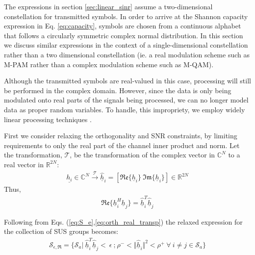 The expressions in section \ref{sec:linear_sinr} assume a two-dimensional constellation for transmitted symbols. In order to arrive at the Shannon capacity expression in Eq. \ref{eq:capacity}, symbols are chosen from a continuous alphabet that follows a circularly symmetric complex normal distribution. In this section we discuss similar expressions in the context of a single-dimensional constellation rather than a two dimensional constellation (ie. a real modulation scheme such as M-PAM rather than a complex modulation scheme such as M-QAM).

Although the transmitted symbols are real-valued in this case, processing will still be performed in the complex domain. However, since the data is only being modulated onto real parts of the signals being processed, we can no longer model data as proper random variables. To handle, this impropriety, we employ widely linear processing techniques \cite{Adali2011}.

First we consider relaxing the orthogonality and SNR constraints, by limiting  requirements to only the real part of the channel inner product and norm.  Let the  transformation, $\mathcal{T}$, be the transformation of the complex vector in $\mathbb{C}^N$ to a real vector in $\mathbb{R}^{2N}$:
\begin{equation}\label{eq:complex_real_xform}
    \begin{aligned}
        \underline{h_i} \in \mathbb{C}^N \xrightarrow{\mathcal{T}} \hat{\underline{h}}_i = [ \mathfrak{Re} \lbrace \underline{h}_i \rbrace \ \mathfrak{Im}\lbrace \underline{h}_i \rbrace ] \in \mathbb{R}^{2N}
    \end{aligned}
\end{equation}
Thus,
\begin{equation}\label{eq:orth_real_transp}
    \begin{aligned}
        \mathfrak{Re} \lbrace \underline{h}_i^H\underline{h}_j \rbrace = \hat{\underline{h}}_i^T \hat{\underline{h}}_j 
    \end{aligned}
\end{equation}

Following from Eqs. (\ref{eq:S_e},\ref{eq:orth_real_transp}) the relaxed expression for the collection of SUS groups becomes:
\begin{equation}\label{eq:wl_S_e}
    \begin{aligned}
        \mathcal{S}_{\epsilon,\mathfrak{R}} = \lbrace \mathcal{S}_a \big|\  \hat{\underline{h}}_i^T \hat{\underline{h}}_j<\ \epsilon \ \text{;} \ \rho^-<\Vert \hat{\underline{h}}_i \Vert^2 < \rho^+\ \forall \ i \neq j \in \mathcal{S}_a \rbrace
    \end{aligned}
\end{equation}

